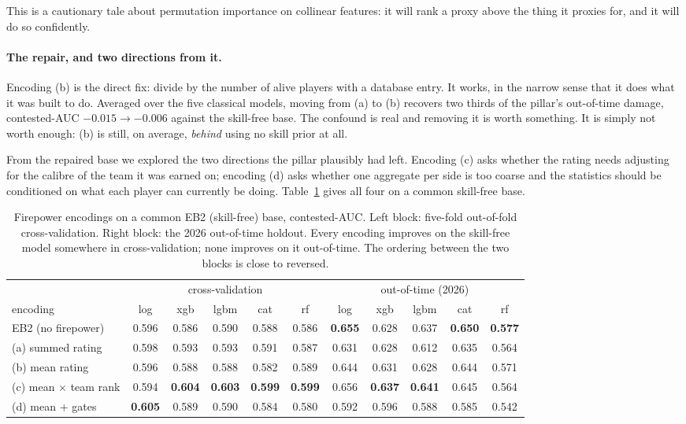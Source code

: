 \documentclass[11pt,a4paper]{article}
\begin{document}
This is a cautionary tale about permutation importance on collinear features: it will rank a
proxy above the thing it proxies for, and it will do so confidently.

\paragraph{The repair, and two directions from it.}
Encoding (b) is the direct fix: divide by the number of alive players with a database entry.
It works, in the narrow sense that it does what it was built to do. Averaged over the five
classical models, moving from (a) to (b) recovers two thirds of the pillar's out-of-time
damage, contested-AUC $-0.015 \to -0.006$ against the skill-free base. The confound is real
and removing it is worth something. It is simply not worth enough: (b) is still, on average,
\emph{behind} using no skill prior at all.

From the repaired base we explored the two directions the pillar plausibly had left.
Encoding (c) asks whether the rating needs adjusting for the calibre of the team it was
earned on; encoding (d) asks whether one aggregate per side is too coarse and the statistics
should be conditioned on what each player can currently be doing. Table~\ref{tab:fpladder}
gives all four on a common skill-free base.

\begin{table}[t]
\centering
\caption{Firepower encodings on a common EB2 (skill-free) base, contested-AUC. Left block:
five-fold out-of-fold cross-validation. Right block: the 2026 out-of-time holdout. Every
encoding improves on the skill-free model somewhere in cross-validation; none improves on it
out-of-time. The ordering between the two blocks is close to reversed.}
\label{tab:fpladder}
\small
\begin{tabular}{lccccc|ccccc}
\toprule
& \multicolumn{5}{c|}{cross-validation} & \multicolumn{5}{c}{out-of-time (2026)} \\
encoding & log & xgb & lgbm & cat & rf & log & xgb & lgbm & cat & rf \\
\midrule
EB2 (no firepower) & 0.596 & 0.586 & 0.590 & 0.588 & 0.586 & \textbf{0.655} & 0.628 & 0.637 & \textbf{0.650} & \textbf{0.577} \\
(a) summed rating & 0.598 & 0.593 & 0.593 & 0.591 & 0.587 & 0.631 & 0.628 & 0.612 & 0.635 & 0.564 \\
(b) mean rating & 0.596 & 0.588 & 0.588 & 0.582 & 0.589 & 0.644 & 0.631 & 0.628 & 0.644 & 0.571 \\
(c) mean $\times$ team rank & 0.594 & \textbf{0.604} & \textbf{0.603} & \textbf{0.599} & \textbf{0.599} & 0.656 & \textbf{0.637} & \textbf{0.641} & 0.645 & 0.564 \\
(d) mean + gates & \textbf{0.605} & 0.589 & 0.590 & 0.584 & 0.580 & 0.592 & 0.596 & 0.588 & 0.585 & 0.542 \\
\bottomrule
\end{tabular}
\end{table}
\end{document}

